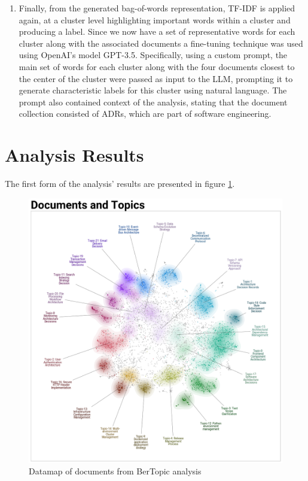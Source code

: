 \begin{enumerate}
            \item Finally, from the generated bag-of-words representation, TF-IDF is applied again, at a cluster level highlighting important words within a cluster and producing a label. Since we now have a set of representative words for each cluster along with the associated documents a fine-tuning technique was used using OpenAI's model GPT-3.5. Specifically, using a custom prompt, the main set of words for each cluster along with the four documents closest to the center of the cluster were passed as input to the LLM, prompting it to generate characteristic labels for this cluster using natural language. The prompt also contained context of the analysis, stating that the document collection consisted of ADRs, which are part of software engineering.
            
        \end{enumerate}
        
        
    \section{Analysis Results}
        The first form of the analysis' results are presented in figure \ref{fig:bertopic_datamap_original}.

        \begin{figure}[h]
            \centering
            \includegraphics[scale=0.5]{figures/BerTopic_Original/datamap_original.png}
            \caption{Datamap of documents from BerTopic analysis}
            \label{fig:bertopic_datamap_original}
        \end{figure}
        
